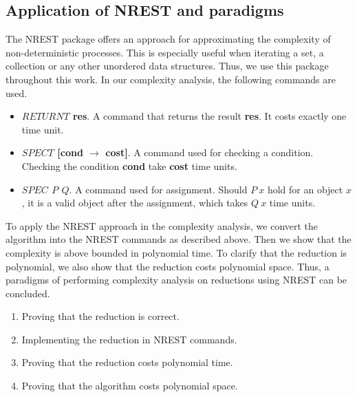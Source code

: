 \subsection*{Application of NREST and paradigms}
The NREST package offers an approach for approximating the complexity of non-deterministic processes.
This is especially useful when iterating a set, a collection or any other unordered data structures. Thus,
we use this package throughout this work. In our complexity analysis, the following commands are used. 
\begin{itemize}
    \item \textbf{$RETURNT$ res}. A command that returns the result \textbf{res}. It costs exactly one time unit.
    \item \textbf{$SPECT$ [cond $\rightarrow$ cost]}. A command used for checking a condition. Checking the condition \textbf{cond}
    take \textbf{cost} time units.
    \item \textbf{$SPEC$ $P$ $Q$}. A command used for assignment. Should $P\ x$ hold for an object $x$, it is a valid object after the assignment,
    which takes $Q\ x$ time units.
\end{itemize}
To apply the NREST approach in the complexity analysis, we convert the algorithm into the NREST commands as described above. Then we show 
that the complexity is above bounded in polynomial time. To clarify that the reduction is polynomial, we also show that the reduction
costs polynomial space. Thus, a paradigms of performing complexity analysis on reductions using NREST can be concluded.
\begin{enumerate}
    \item Proving that the reduction is correct.
    \item Implementing the reduction in NREST commands.
    \item Proving that the reduction costs polynomial time.
    \item Proving that the algorithm costs polynomial space.
\end{enumerate}

